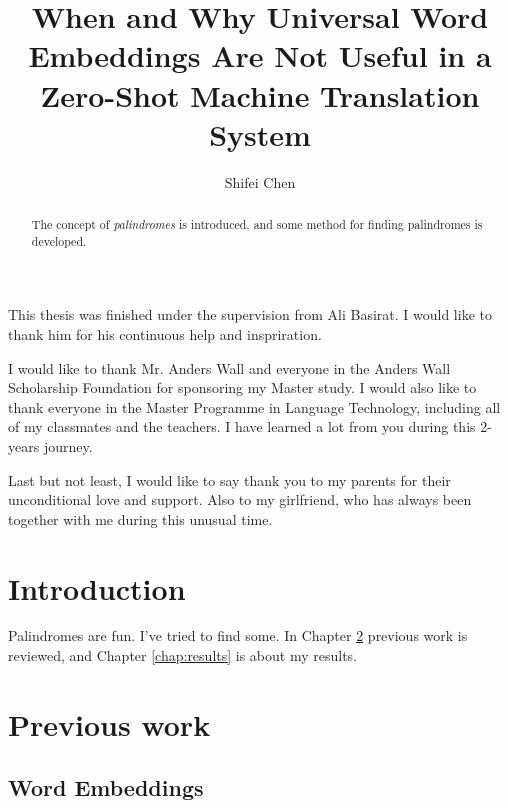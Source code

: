 \documentclass[thesis,fonts=libertine]{cluu}
\begin{document}
\author{Shifei Chen}
\title{When and Why Universal Word Embeddings Are Not Useful in a Zero-Shot Machine Translation System}

\maketitle

\begin{abstract}
  The concept of \emph{palindromes} is introduced, and some method for
  finding palindromes is developed.
\end{abstract}

\tableofcontents


This thesis was finished under the supervision from Ali Basirat. I would like 
to thank him for his continuous help and inspriration.

I would like to thank Mr. Anders Wall and everyone in the Anders Wall Scholarship Foundation for sponsoring my Master study. I would also like to thank everyone in the Master Programme in Language Technology, including all of my classmates and the teachers. I have learned a lot from you during this 2-years journey.

Last but not least, I would like to say thank you to my parents for their unconditional love and support. Also to my girlfriend, who has always been together with me during this unusual time.


\chapter{Introduction}

Palindromes are fun. I've tried to find some.
In Chapter \ref{chap:prev} previous work is reviewed, and
Chapter \ref{chap:results} is about my results.

\chapter{Previous work}
\label{chap:prev}

\section{Word Embeddings}
\end{document}
